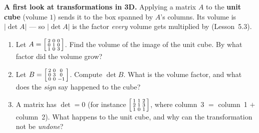 \documentclass[10pt]{article}
\begin{document}
\begin{tcolorbox}[colback=white, colframe=black!40, title=\textbf{Tier E --- Extension},
    fonttitle=\bfseries, arc=1.5mm, left=3mm, right=3mm, top=2mm, bottom=2mm, breakable]
\textbf{A first look at transformations in 3D.} Applying a matrix $A$ to the \textbf{unit cube}
(volume $1$) sends it to the box spanned by $A$'s columns. Its volume is $|\det A|$ --- so $|\det A|$
is the factor \emph{every} volume gets multiplied by (Lesson~5.3).
\begin{enumerate}[leftmargin=1.7em, itemsep=9pt]
  \item Let $A=\begin{bsmallmatrix} 2 & 0 & 0 \\ 0 & 1 & 0 \\ 1 & 0 & 3 \end{bsmallmatrix}$. Find the volume of the image
        of the unit cube. By what factor did the volume grow? 
  \item Let $B=\begin{bsmallmatrix} 2 & 0 & 0 \\ 0 & 3 & 0 \\ 0 & 0 & -1 \end{bsmallmatrix}$. Compute $\det B$.
        What is the volume factor, and what does the \emph{sign} say happened to the cube? 
  \item A matrix has $\det=0$ (for instance $\begin{bsmallmatrix} 1 & 1 & 2 \\ 2 & 1 & 3 \\ 1 & 0 & 1 \end{bsmallmatrix}$,
        where column~3 $=$ column~1 $+$ column~2). What happens to the unit cube, and why can the
        transformation not be \emph{undone}? 
\end{enumerate}
\end{tcolorbox}
\end{document}
